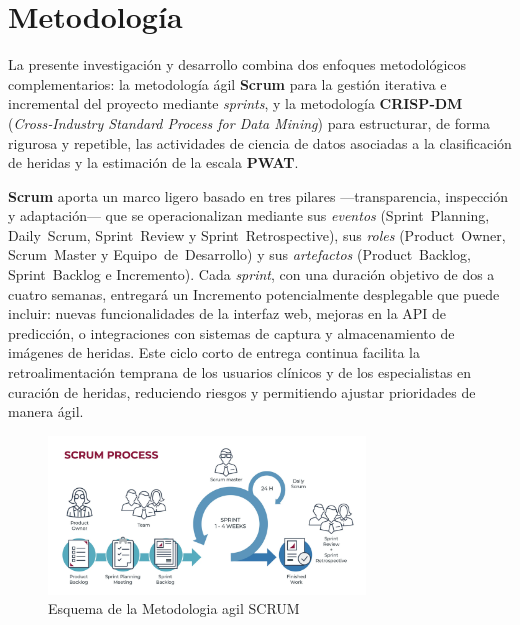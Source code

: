 
\section{Metodología}
\label{sc:Met}

La presente investigación y desarrollo combina dos enfoques metodológicos complementarios: la metodología ágil \textbf{Scrum} \cite{sachdeva2016scrum} para la gestión iterativa e incremental del proyecto mediante \emph{sprints}, y la metodología \textbf{CRISP‑DM} (\emph{Cross‑Industry Standard Process for Data Mining}) \cite{wirth2000crisp} para estructurar, de forma rigurosa y repetible, las actividades de ciencia de datos asociadas a la clasificación de heridas y la estimación de la escala \textbf{PWAT}.

\textbf{Scrum} aporta un marco ligero basado en tres pilares —transparencia, inspección y adaptación— que se operacionalizan mediante sus \emph{eventos} (Sprint Planning, Daily Scrum, Sprint Review y Sprint Retrospective), sus \emph{roles} (Product Owner, Scrum Master y Equipo de Desarrollo) y sus \emph{artefactos} (Product Backlog, Sprint Backlog e Incremento). Cada \emph{sprint}, con una duración objetivo de dos a cuatro semanas, entregará un Incremento potencialmente desplegable que puede incluir: nuevas funcionalidades de la interfaz web, mejoras en la API de predicción, o integraciones con sistemas de captura y almacenamiento de imágenes de heridas. Este ciclo corto de entrega continua facilita la retroalimentación temprana de los usuarios clínicos y de los especialistas en curación de heridas, reduciendo riesgos y permitiendo ajustar prioridades de manera ágil.
\begin{figure}[H] %
    \centering
    \includegraphics[width=0.75\textwidth]{imagenes/800px-CRISP-DM_Process_Diagram (2).png}
    \caption{Esquema de la Metodologia agil SCRUM}
    \label{fig:scrum}
\end{figure}



